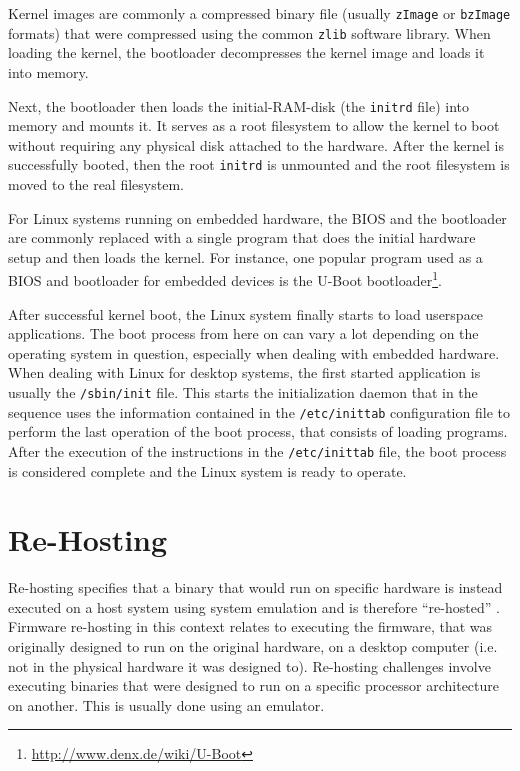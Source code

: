 Kernel images are commonly a compressed binary file (usually {\tt zImage} or {\tt bzImage} formats) that were compressed using the common {\tt zlib} software library. When loading the kernel, the bootloader decompresses the kernel image and loads it into memory.

Next, the bootloader then loads the initial-RAM-disk (the {\tt initrd} file) into memory and mounts it. It serves as a root filesystem to allow the kernel to boot without requiring any physical disk attached to the hardware. After the kernel is successfully booted, then the root {\tt initrd} is unmounted and the root filesystem is moved to the real filesystem.

For Linux systems running on embedded hardware, the BIOS and the bootloader are commonly replaced with a single program that does the initial hardware setup and then loads the kernel. For instance, one popular program used as a BIOS and bootloader for embedded devices is the U-Boot bootloader\footnote{\url{http://www.denx.de/wiki/U-Boot}}.

After successful kernel boot, the Linux system finally starts to load userspace applications. The boot process from here on can vary a lot depending on the operating system in question, especially when dealing with embedded hardware. When dealing with Linux for desktop systems, the first started application is usually the {\tt /sbin/init} file. This starts the initialization daemon that in the sequence uses the information contained in the {\tt /etc/inittab} configuration file to perform the last operation of the boot process, that consists of loading programs. After the execution of the instructions in the {\tt /etc/inittab} file, the boot process is considered complete and the Linux system is ready to operate.

\section{Re-Hosting}
\label{sec:rehosting}

Re-hosting specifies that a binary that would run on specific hardware is instead executed on a host system using system emulation and is therefore ``re-hosted'' \cite{firmware-challenges}. Firmware re-hosting in this context relates to executing the firmware, that was originally designed to run on the original hardware, on a desktop computer (i.e. not in the physical hardware it was designed to). Re-hosting challenges involve executing binaries that were designed to run on a specific processor architecture on another. This is usually done using an emulator.

